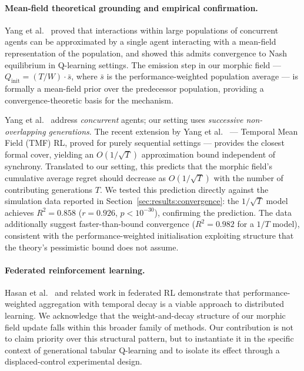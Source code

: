 \documentclass[twoside,11pt]{article}
\begin{document}
\paragraph{Mean-field theoretical grounding and empirical confirmation.}
Yang et al.~\citep{yang2018meanfield} proved that interactions within large
populations of concurrent agents can be approximated by a single agent
interacting with a mean-field representation of the population, and showed
this admits convergence to Nash equilibrium in Q-learning settings.  The
emission step in our morphic field --- $Q_{\text{init}} = (T/W) \cdot
\bar{s}$, where $\bar{s}$ is the performance-weighted population average ---
is formally a mean-field prior over the predecessor population, providing
a convergence-theoretic basis for the mechanism.

Yang et al.~\citep{yang2018meanfield} address \emph{concurrent} agents;
our setting uses \emph{successive non-overlapping generations}.  The recent
extension by Yang et al.~\citep{yang2026tmf} --- Temporal Mean Field (TMF) RL,
proved for purely sequential settings --- provides the closest formal cover,
yielding an $O(1/\sqrt{T})$ approximation bound independent of synchrony.
Translated to our setting, this predicts that the morphic field's cumulative
average regret should decrease as $O(1/\sqrt{T})$ with the number of
contributing generations $T$.  We tested this prediction directly against the
simulation data reported in Section~\ref{sec:results:convergence}: the
$1/\sqrt{T}$ model achieves $R^2 = 0.858$ ($r = 0.926$, $p < 10^{-30}$),
confirming the prediction.  The data additionally suggest faster-than-bound
convergence ($R^2 = 0.982$ for a $1/T$ model), consistent with the
performance-weighted initialisation exploiting structure that the
theory's pessimistic bound does not assume.

\paragraph{Federated reinforcement learning.}
Hasan et al.~\citep{hasan2025fedrwa} and related work in federated RL
demonstrate that performance-weighted aggregation with temporal decay is a
viable approach to distributed learning.  We acknowledge that the
weight-and-decay structure of our morphic field update falls within this
broader family of methods.  Our contribution is not to claim priority over
this structural pattern, but to instantiate it in the specific context of
generational tabular Q-learning and to isolate its effect through a
displaced-control experimental design.
\end{document}
